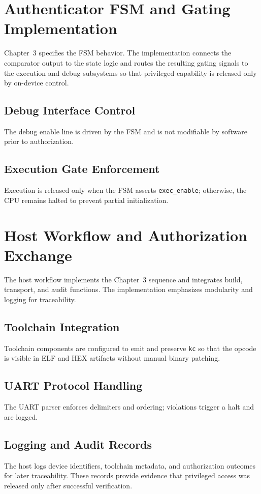 \section{Authenticator FSM and Gating Implementation}
Chapter~3 specifies the FSM behavior. The implementation connects the comparator output to the
state logic and routes the resulting gating signals to the execution and debug subsystems so
that privileged capability is released only by on-device control.

\subsection{Debug Interface Control}
The debug enable line is driven by the FSM and is not modifiable by software prior to
authorization.

\subsection{Execution Gate Enforcement}
Execution is released only when the FSM asserts \texttt{exec\_enable}; otherwise, the CPU
remains halted to prevent partial initialization.

\section{Host Workflow and Authorization Exchange}
The host workflow implements the Chapter~3 sequence and integrates build, transport, and audit
functions. The implementation emphasizes modularity and logging for traceability.

\subsection{Toolchain Integration}
Toolchain components are configured to emit and preserve \texttt{kc} so that the opcode is
visible in ELF and HEX artifacts without manual binary patching.

\subsection{UART Protocol Handling}
The UART parser enforces delimiters and ordering; violations trigger a halt and are logged.

\subsection{Logging and Audit Records}
The host logs device identifiers, toolchain metadata, and authorization outcomes for later
traceability. These records provide evidence that privileged access was released only after
successful verification.

